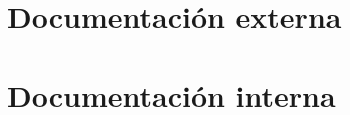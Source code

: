 \documentclass[a4paper,12pt,twoside,final]{book}
\begin{document}

\part{Documentación externa}

\part{Documentación interna}








%
%
\printbibliography

\renewcommand{\appendixpagename}{Anexos}
\renewcommand{\appendixtocname}{Anexos}
\renewcommand{\appendixname}{Anexo}
\end{document}
